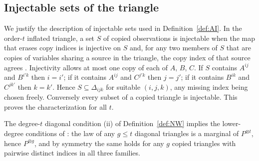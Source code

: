 \subsection{Injectable sets of the triangle}\label{app:injectable}

We justify the description of injectable sets used in Definition~\ref{def:AI}. In the order-$t$ inflated triangle, a set $S$ of copied observations is injectable when the map that erases copy indices is injective on $S$ and, for any two members of $S$ that are copies of variables sharing a source in the triangle, the copy index of that source agrees \cite[Definition~4]{WSF2019}. Injectivity allows at most one copy of each of $A$, $B$, $C$. If $S$ contains $A^{ij}$ and $B^{i'k}$ then $i=i'$; if it contains $A^{ij}$ and $C^{j'k}$ then $j=j'$; if it contains $B^{ik}$ and $C^{jk'}$ then $k=k'$. Hence $S\subseteq\Delta_{ijk}$ for suitable $(i,j,k)$, any missing index being chosen freely. Conversely every subset of a copied triangle is injectable. This proves the characterization for all $t$.

The degree-$t$ diagonal condition (ii) of Definition~\ref{def:NW} implies the lower-degree conditions of \cite{NW2020}: the law of any $g\le t$ diagonal triangles is a marginal of $P^{\otimes t}$, hence $P^{\otimes g}$, and by symmetry the same holds for any $g$ copied triangles with pairwise distinct indices in all three families.
